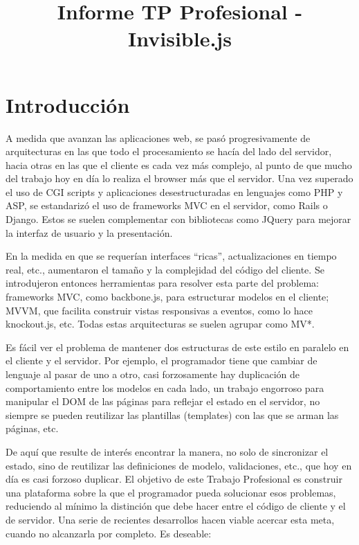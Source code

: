 \documentclass[doc,helv,longtable]{article}
\begin{document}
\title{Informe TP Profesional - Invisible.js}
\maketitle

\tableofcontents

\section{Introducción}

A medida que avanzan las aplicaciones web, se pasó progresivamente de arquitecturas en las que todo el procesamiento se hacía del lado del servidor, hacia otras en las que el cliente es cada vez más complejo, al punto de que mucho del trabajo hoy en día lo realiza el browser más que el servidor\cite{jsmvcvs}. Una vez superado el uso de CGI scripts y aplicaciones desestructuradas en lenguajes como PHP y ASP, se estandarizó el uso de frameworks MVC en el servidor, como Rails o Django. Estos se suelen complementar con bibliotecas como JQuery para mejorar la interfaz de usuario y la presentación. 

En la medida en que se requerían interfaces “ricas”\cite{rich}, actualizaciones en tiempo real, etc., aumentaron el tamaño y la complejidad del código del cliente. Se introdujeron entonces herramientas para resolver esta parte del problema\cite{richjs}: frameworks MVC, como backbone.js\cite{backbone}, para estructurar modelos en el cliente; MVVM, que facilita construir vistas responsivas a eventos, como lo hace knockout.js\cite{knockout}, etc. Todas estas arquitecturas se suelen agrupar como MV*\cite{mvw}.

Es fácil ver el problema de mantener dos estructuras de este estilo en paralelo en el cliente y el servidor. Por ejemplo, el programador tiene que cambiar de lenguaje al pasar de uno a otro, casi forzosamente hay duplicación de comportamiento entre los modelos en cada lado, un trabajo engorroso para manipular el DOM de las páginas para reflejar el estado en el servidor, no siempre se pueden reutilizar las plantillas (templates) con las que se arman las páginas, etc.\cite{wdsucks}

De aquí que resulte de interés encontrar la manera, no solo de sincronizar el estado, sino de reutilizar las definiciones de modelo, validaciones, etc., que hoy en día es casi forzoso duplicar. El objetivo de este Trabajo Profesional es construir una plataforma sobre la que el programador pueda solucionar esos problemas, reduciendo al mínimo la distinción que debe hacer entre el código de cliente y el de servidor. Una serie de recientes desarrollos hacen viable acercar esta meta, cuando no alcanzarla por completo. Es deseable:
\end{document}
